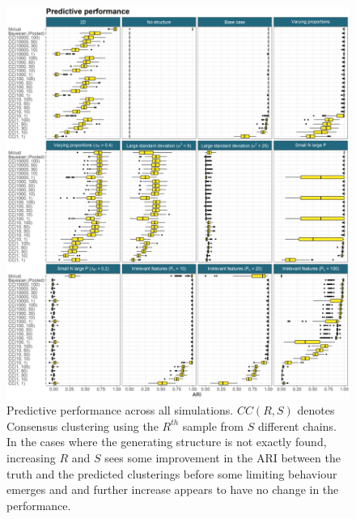 \documentclass[]{article}
\begin{document}
\begin{figure} %
	\centering
	\includegraphics[scale=0.4]{./Images/Simulations/simulation_model_prediction.png}
	\caption{Predictive performance across all simulations. $CC(R, S)$ denotes Consensus clustering using the $R^{th}$ sample from $S$ different chains. In the cases where the generating structure is not exactly found, increasing $R$ and $S$ sees some improvement in the ARI between the truth and the predicted clusterings before some limiting behaviour emerges and and further increase appears to have no change in the performance.}
	\label{fig:simPrediction}
\end{figure}

\end{document}
